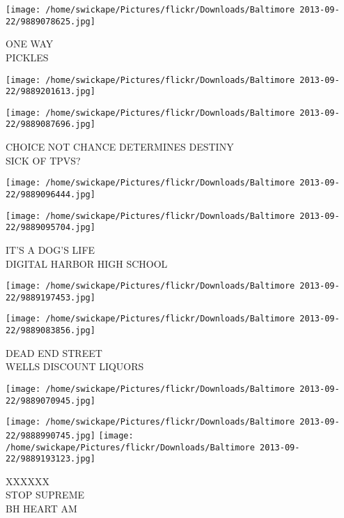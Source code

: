 \documentclass[10pt,letterpaper]{article}
\begin{document}
\vspace{0.25in}
\texttt{[image: /home/swickape/Pictures/flickr/Downloads/Baltimore 2013-09-22/9889078625.jpg]}

ONE WAY\\
PICKLES\\
\pagebreak

\texttt{[image: /home/swickape/Pictures/flickr/Downloads/Baltimore 2013-09-22/9889201613.jpg]}

\vspace{0.25in}
\texttt{[image: /home/swickape/Pictures/flickr/Downloads/Baltimore 2013-09-22/9889087696.jpg]}

CHOICE NOT CHANCE DETERMINES DESTINY\\
SICK OF TPVS?\\
\pagebreak

\texttt{[image: /home/swickape/Pictures/flickr/Downloads/Baltimore 2013-09-22/9889096444.jpg]}

\vspace{0.25in}
\texttt{[image: /home/swickape/Pictures/flickr/Downloads/Baltimore 2013-09-22/9889095704.jpg]}

IT'S A DOG'S LIFE\\
DIGITAL HARBOR HIGH SCHOOL\\
\pagebreak

\texttt{[image: /home/swickape/Pictures/flickr/Downloads/Baltimore 2013-09-22/9889197453.jpg]}

\vspace{0.25in}
\texttt{[image: /home/swickape/Pictures/flickr/Downloads/Baltimore 2013-09-22/9889083856.jpg]}

DEAD END STREET\\
WELLS DISCOUNT LIQUORS\\
\pagebreak

\texttt{[image: /home/swickape/Pictures/flickr/Downloads/Baltimore 2013-09-22/9889070945.jpg]}

\vspace{0.25in}
\texttt{[image: /home/swickape/Pictures/flickr/Downloads/Baltimore 2013-09-22/9888990745.jpg]}
\texttt{[image: /home/swickape/Pictures/flickr/Downloads/Baltimore 2013-09-22/9889193123.jpg]}

XXXXXX\\
STOP SUPREME\\
BH HEART AM\\
\pagebreak
\end{document}
